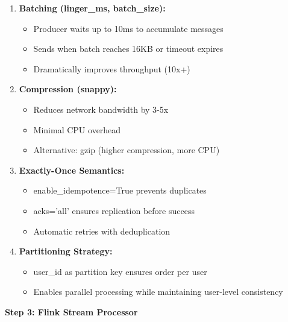 \begin{enumerate}
    \item \textbf{Batching (linger\_ms, batch\_size):}
    \begin{itemize}
        \item Producer waits up to 10ms to accumulate messages
        \item Sends when batch reaches 16KB or timeout expires
        \item Dramatically improves throughput (10x+)
    \end{itemize}

    \item \textbf{Compression (snappy):}
    \begin{itemize}
        \item Reduces network bandwidth by 3-5x
        \item Minimal CPU overhead
        \item Alternative: gzip (higher compression, more CPU)
    \end{itemize}

    \item \textbf{Exactly-Once Semantics:}
    \begin{itemize}
        \item enable\_idempotence=True prevents duplicates
        \item acks='all' ensures replication before success
        \item Automatic retries with deduplication
    \end{itemize}

    \item \textbf{Partitioning Strategy:}
    \begin{itemize}
        \item user\_id as partition key ensures order per user
        \item Enables parallel processing while maintaining user-level consistency
    \end{itemize}
\end{enumerate}

\textbf{Step 3: Flink Stream Processor}

